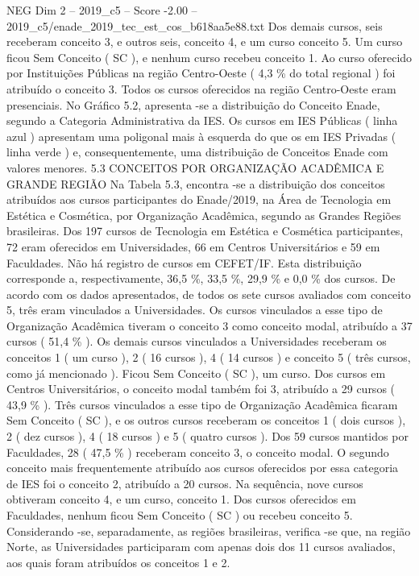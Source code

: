 \begin{textsample}{NEG Dim 2 – 2019\_c5 – Score -2.00 – 2019\_c5/enade\_2019\_tec\_est\_cos\_b618aa5e88.txt}
Dos demais cursos, seis receberam conceito 3, e outros seis, conceito 4, e um curso conceito 5.
Um curso ficou Sem Conceito ( SC ), e nenhum curso recebeu conceito 1.
Ao curso oferecido por Instituições Públicas na região Centro-Oeste ( 4,3 \% do total regional ) foi atribuído o conceito 3.
Todos os cursos oferecidos na região Centro-Oeste eram presenciais.
No Gráfico 5.2, apresenta -se a distribuição do Conceito Enade, segundo a Categoria Administrativa da IES.
Os cursos em IES Públicas ( linha azul ) apresentam uma poligonal mais à esquerda do que os em IES Privadas ( linha verde ) e, consequentemente, uma distribuição de Conceitos Enade com valores menores. 5.3 CONCEITOS POR ORGANIZAÇÃO ACADÊMICA E GRANDE REGIÃO Na Tabela 5.3, encontra -se a distribuição dos conceitos atribuídos aos cursos participantes do Enade/2019, na Área de Tecnologia em Estética e Cosmética, por Organização Acadêmica, segundo as Grandes Regiões brasileiras.
Dos 197 cursos de Tecnologia em Estética e Cosmética participantes, 72 eram oferecidos em Universidades, 66 em Centros Universitários e 59 em Faculdades.
Não há registro de cursos em CEFET/IF.
Esta distribuição corresponde a, respectivamente, 36,5 \%, 33,5 \%, 29,9 \% e 0,0 \% dos cursos.
De acordo com os dados apresentados, de todos os sete cursos avaliados com conceito 5, três eram vinculados a Universidades.
Os cursos vinculados a esse tipo de Organização Acadêmica tiveram o conceito 3 como conceito modal, atribuído a 37 cursos ( 51,4 \% ).
Os demais cursos vinculados a Universidades receberam os conceitos 1 ( um curso ), 2 ( 16 cursos ), 4 ( 14 cursos ) e conceito 5 ( três cursos, como já mencionado ).
Ficou Sem Conceito ( SC ), um curso.
Dos cursos em Centros Universitários, o conceito modal também foi 3, atribuído a 29 cursos ( 43,9 \% ).
Três cursos vinculados a esse tipo de Organização Acadêmica ficaram Sem Conceito ( SC ), e os outros cursos receberam os conceitos 1 ( dois cursos ), 2 ( dez cursos ), 4 ( 18 cursos ) e 5 ( quatro cursos ).
Dos 59 cursos mantidos por Faculdades, 28 ( 47,5 \% ) receberam conceito 3, o conceito modal.
O segundo conceito mais frequentemente atribuído aos cursos oferecidos por essa categoria de IES foi o conceito 2, atribuído a 20 cursos.
Na sequência, nove cursos obtiveram conceito 4, e um curso, conceito 1.
Dos cursos oferecidos em Faculdades, nenhum ficou Sem Conceito ( SC ) ou recebeu conceito 5.
Considerando -se, separadamente, as regiões brasileiras, verifica -se que, na região Norte, as Universidades participaram com apenas dois dos 11 cursos avaliados, aos quais foram atribuídos os conceitos 1 e 2.

\end{textsample}
